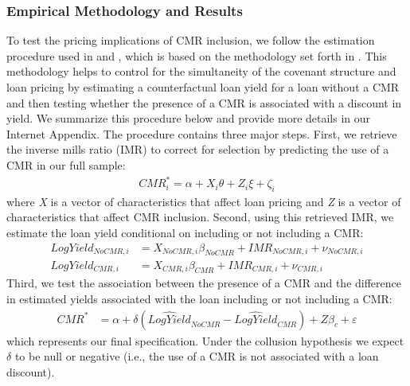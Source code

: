 \documentclass[a4paper,12pt]{article}
\begin{document}
\subsubsection{Empirical Methodology and Results}
To test the pricing implications of CMR inclusion, we follow the estimation procedure used in \cite{Miller_2012} and \cite{Bradley_2015}, which is based on the methodology set forth in \cite{Lee_1978}.
This methodology helps to control for the simultaneity of the covenant structure and loan pricing by estimating a counterfactual loan yield for a loan without a CMR and then testing whether the presence of a CMR is associated with a discount in yield. 
We summarize this procedure below and provide more details in our Internet Appendix. 
The procedure contains three major steps.
First, we retrieve the inverse mills ratio (IMR) to correct for selection \citep{Heckman_1979} by predicting the use of a CMR in our full sample:
 \begin{align}
 CMR^*_i = \alpha + X_i \theta + Z_i \xi + \zeta_i
 \end{align}%
  where \textit{X} is a vector of characteristics that affect loan pricing and \textit{Z} is a vector of characteristics that affect CMR inclusion.
Second, using this retrieved IMR, we estimate the loan yield conditional on including or not including a CMR: 
 \begin{align}
 LogYield_{NoCMR,i} &= X_{NoCMR,i} \beta_{NoCMR} + IMR_{NoCMR,i} + \nu_{NoCMR,i} \\
 LogYield_{CMR,i} &= X_{CMR,i} \beta_{CMR} + IMR_{CMR,i} + \nu_{CMR,i}
 \end{align}
Third, we test the association between the presence of a CMR and the difference in estimated yields associated with the loan including or not including a CMR:
 \begin{align}
 CMR^* &= \alpha + \delta \left(\widehat{LogYield}_{NoCMR} - \widehat{LogYield}_{CMR}\right) + Z\beta_c + \varepsilon
 \end{align}%
which represents our final specification.
Under the collusion hypothesis we expect $\delta$ to be null or negative (i.e., the use of a CMR is not associated with a loan discount). 
\end{document}
